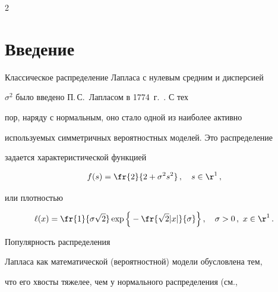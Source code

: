 









      \thispagestyle{headings}





      \begin{multicols}{2}





      \label{st\stat}





\section{Введение}





Классическое распределение Лапласа с нулевым средним и дисперсией


$\sigma^2$ было введено П.\,С.~Лапласом в 1774~г.~\cite{45be}. С тех


пор, наряду с нормальным, оно стало одной из наиболее активно


использу\-емых симметричных вероятностных моделей. Это распределение


задается характеристической функцией


$$


f(s)=\fr{2}{2+\sigma^2s^2}\,,\quad s\in{\r}^1\,,


$$


или плотностью


$$


\ell(x)=\fr{1}{\sigma\sqrt{2}}\exp\Big\{-\fr{\sqrt{2}|x|}{\sigma}\Big\}\,,\quad


\sigma>0\,,\ x\in{\r}^1\,.


$$


Популярность распределения


Лапласа как математической (вероятностной) модели обусловлена тем,


что его хвосты тяжелее, чем у нормального рас\-пределения (см.,



\end{multicols}
